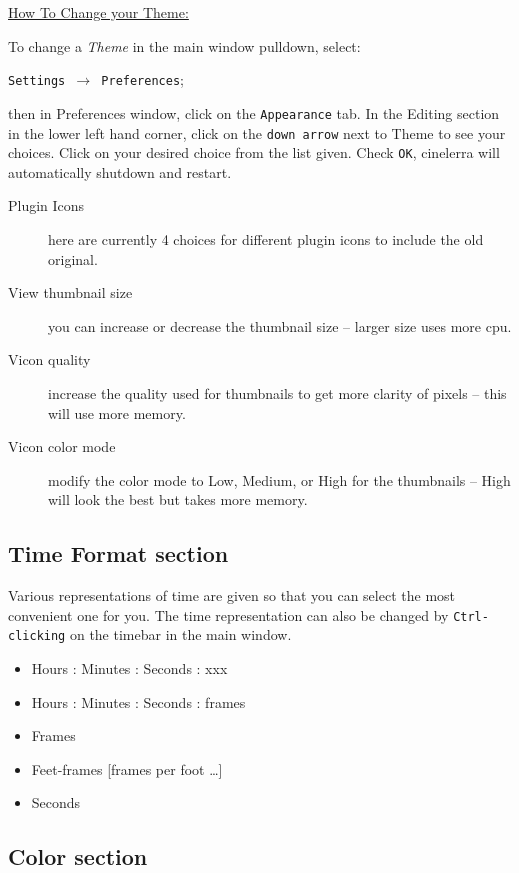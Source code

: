 \underline{How To Change your Theme:}

To change a \textit{Theme} in the main window pulldown, select:

\texttt{Settings $\rightarrow$ Preferences};

then in Preferences window, click on the \texttt{Appearance} tab. In the Editing section in the lower left hand corner,	click on the \texttt{down arrow} next to Theme to see your choices. Click on your desired choice from the list given. Check \texttt{OK}, cinelerra will automatically shutdown and restart.

\begin{description}
    \item[Plugin Icons] here are currently 4 choices for different plugin icons to include the old original.
    \item[View thumbnail size] you can increase or decrease the thumbnail size -- larger size uses more cpu.
    \item[Vicon quality]  increase the quality used for thumbnails to get more clarity of pixels -- this will use
    more memory.
    \item[Vicon color mode] modify the color mode to Low, Medium, or High for the thumbnails -- High will
    look the best but takes more memory.
\end{description}

\subsection{Time Format section}%
\label{sub:time_format_section}

Various representations of time are given so that you can select the most convenient one for you. The time representation can also be changed by \texttt{Ctrl-clicking} on the timebar in the main window.

\begin{itemize}[noitemsep]
    \item Hours : Minutes : Seconds : xxx
    \item Hours : Minutes : Seconds : frames
    \item Frames
    \item Feet-frames  [frames per foot \dots]
    \item Seconds
\end{itemize}

\subsection{Color section}%
\label{sub:color_section}


